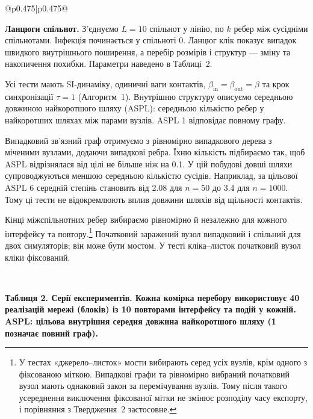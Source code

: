 \documentclass[11pt]{article}
\begin{document}
\begin{longtable}{@{}p{0.475\textwidth}|p{0.475\textwidth}@{}}
\begin{minipage}[t]{\linewidth}
\par \textbf{Ланцюги спільнот.} З'єднуємо $L=10$ спільнот у лінію, по $k$ ребер між сусідніми спільнотами. Інфекція починається у спільноті 0. Ланцюг клік показує випадок швидкого внутрішнього поширення, а перебір розмірів і структур --- зміну та накопичення похибки. Параметри наведено в Таблиці~2.
\par Усі тести мають SI-динаміку, одиничні ваги контактів, $\beta_{\mathrm{in}}=\beta_{\mathrm{out}}=\beta$ та крок синхронізації $\tau=1$ (Алгоритм~1). Внутрішню структуру описуємо середньою довжиною найкоротшого шляху (ASPL): середньою кількістю ребер у найкоротших шляхах між парами вузлів. ASPL 1 відповідає повному графу.
\par Випадковий зв'язний граф отримуємо з рівномірно випадкового дерева з міченими вузлами, додаючи випадкові ребра. Їхню кількість підбираємо так, щоб ASPL відрізнялася від цілі не більше ніж на 0.1. У цій побудові довші шляхи супроводжуються меншою середньою кількістю сусідів. Наприклад, за цільової ASPL 6 середній степінь становить від 2.08 для $n=50$ до 3.4 для $n=1000$. Тому ці тести не відокремлюють вплив довжини шляхів від щільності контактів.
\par Кінці міжспільнотних ребер вибираємо рівномірно й незалежно для кожного інтерфейсу та повтору.\footnote{У тестах «джерело--листок» мости вибирають серед усіх вузлів, крім одного з фіксованою міткою. Випадкові графи та рівномірно вибраний початковий вузол мають однаковий закон за перемічування вузлів. Тому після такого усереднення виключення фіксованої мітки не змінює розподілу часу експорту, і порівняння з Твердження~2 застосовне.} Початковий заражений вузол випадковий і спільний для двох симуляторів; він може бути мостом. У тесті кліка--листок початковий вузол кліки фіксований.
\end{minipage} \\[5mm]
\begin{minipage}[t]{\linewidth}
\par\noindent\begin{minipage}{\linewidth}
\centering
\par\small\textbf{Таблиця 2. Серії експериментів. Кожна комірка перебору використовує 40 реалізацій мережі (блоків) із 10 повторами інтерфейсу та подій у кожній. ASPL: цільова внутрішня середня довжина найкоротшого шляху (1 позначає повний граф).}


\end{minipage}
\end{minipage}
\end{longtable}
\end{document}
